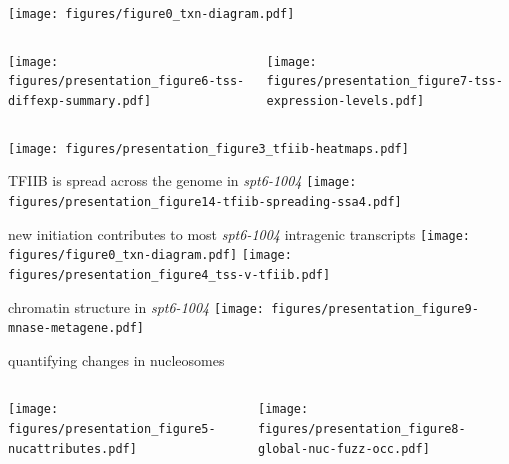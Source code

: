 \documentclass[aspectratio=169]{beamer}
\begin{document}
\begin{frame}
    \centering
    \texttt{[image: figures/figure0\_txn-diagram.pdf]}
    \begin{columns}
        \begin{column}{0.5\textwidth}
            \centering
            \texttt{[image: figures/presentation\_figure6-tss-diffexp-summary.pdf]}
        \end{column}
        \begin{column}{0.5\textwidth}
            \centering
            \pause
            \texttt{[image: figures/presentation\_figure7-tss-expression-levels.pdf]}
        \end{column}
    \end{columns}
\end{frame}

\begin{frame}
    \centering
    \texttt{[image: figures/presentation\_figure3\_tfiib-heatmaps.pdf]}
\end{frame}

\begin{frame}{TFIIB is spread across the genome in \textit{spt6-1004}}
\texttt{[image: figures/presentation\_figure14-tfiib-spreading-ssa4.pdf]}
\end{frame}

\begin{frame}{new initiation contributes to most \textit{spt6-1004} intragenic transcripts}
    \centering
    \texttt{[image: figures/figure0\_txn-diagram.pdf]}
    \texttt{[image: figures/presentation\_figure4\_tss-v-tfiib.pdf]}
\end{frame}

\begin{frame}{chromatin structure in \textit{spt6-1004}}
\texttt{[image: figures/presentation\_figure9-mnase-metagene.pdf]}
\end{frame}

\begin{frame}{quantifying changes in nucleosomes}
    \begin{columns}
        \begin{column}{0.5\textwidth}
            \centering
            \texttt{[image: figures/presentation\_figure5-nucattributes.pdf]}
        \end{column}
        \begin{column}{0.5\textwidth}
            \centering
            \pause
            \texttt{[image: figures/presentation\_figure8-global-nuc-fuzz-occ.pdf]}
        \end{column}
    \end{columns}
\end{frame}
\end{document}
